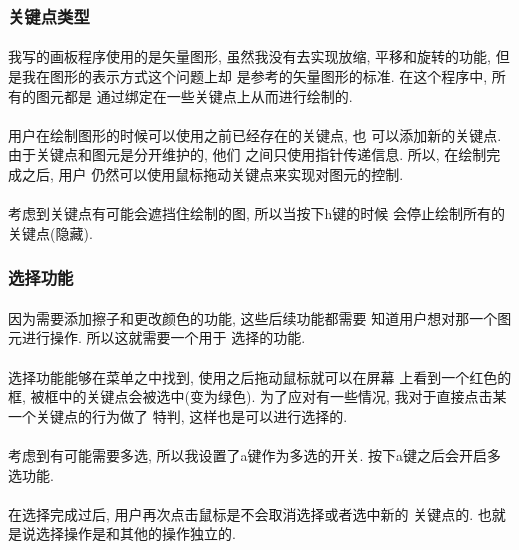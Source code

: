 \documentclass{article}
\begin{document}
		\subsubsection{关键点类型}
			\paragraph{}
				我写的画板程序使用的是矢量图形, 虽然我没有去实现放缩,
				平移和旋转的功能, 但是我在图形的表示方式这个问题上却
				是参考的矢量图形的标准. 在这个程序中, 所有的图元都是
				通过绑定在一些关键点上从而进行绘制的. 
			\paragraph{}
				用户在绘制图形的时候可以使用之前已经存在的关键点, 也
				可以添加新的关键点. 由于关键点和图元是分开维护的, 他们
				之间只使用指针传递信息. 所以, 在绘制完成之后, 用户
				仍然可以使用鼠标拖动关键点来实现对图元的控制.
			\paragraph{}
				考虑到关键点有可能会遮挡住绘制的图, 所以当按下h键的时候
				会停止绘制所有的关键点(隐藏).
		\subsubsection{选择功能}
			\paragraph{}
				因为需要添加擦子和更改颜色的功能, 这些后续功能都需要
				知道用户想对那一个图元进行操作. 所以这就需要一个用于
				选择的功能. 
			\paragraph{}
				选择功能能够在菜单之中找到, 使用之后拖动鼠标就可以在屏幕
				上看到一个红色的框, 被框中的关键点会被选中(变为绿色).
				为了应对有一些情况, 我对于直接点击某一个关键点的行为做了
				特判, 这样也是可以进行选择的.
			\paragraph{}
				考虑到有可能需要多选, 所以我设置了a键作为多选的开关.
				按下a键之后会开启多选功能.
			\paragraph{}
				在选择完成过后, 用户再次点击鼠标是不会取消选择或者选中新的
				关键点的. 也就是说选择操作是和其他的操作独立的. 
\end{document}

